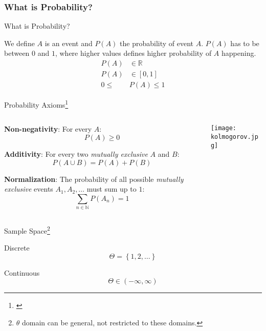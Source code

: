 \subsubsection{What is Probability?}
\begin{frame}{What is Probability?}
	\begin{defn}[Probability]
		We define $A$ is an event and $P(A)$ the probability of event $A$.
		$P(A)$ has to be between $0$ and $1$, where higher values defines
		higher probability of $A$ happening.
		$$\begin{aligned}
				P(A)   & \in \mathbb{R} \\
				P(A)   & \in [0,1]      \\
				0 \leq & P(A) \leq 1
			\end{aligned}$$
	\end{defn}
\end{frame}

\begin{frame}{Probability Axioms\footnote{\textcite{kolmogorovFoundationsTheoryProbability1933}}}
	\begin{columns}
		\begin{column}{0.8\textwidth}
			\begin{vfilleditems}
				\item \textbf{Non-negativity}: For every $A$:
				$$P(A) \geq 0$$
				\vspace{-0.65cm}
				\item \textbf{Additivity}: For every two \textit{mutually exclusive}
				$A$ and $B$:
				$$P(A \cup B) = P(A) + P(B)$$
				\vspace{-0.65cm}
				\item \textbf{Normalization}: The probability of all possible \textit{mutually exclusive} events $A_1, A_2, \dots$ must sum up to $1$:
				$$\sum_{n \in \mathbb{N}} P(A_n) = 1$$
			\end{vfilleditems}
		\end{column}
		\begin{column}{0.2\textwidth}
			\centering
			\texttt{[image: kolmogorov.jpg]}
		\end{column}
	\end{columns}
\end{frame}

\begin{frame}{Sample Space\footnote{$\theta$ domain can be general, not restricted to these domains.}}
	\begin{vfilleditems}
		\item Discrete $$\Theta = \left\{1, 2, \ldots \right\}$$
		\item Continuous $$\Theta \in \left(-\infty, \infty \right)$$
	\end{vfilleditems}
\end{frame}

